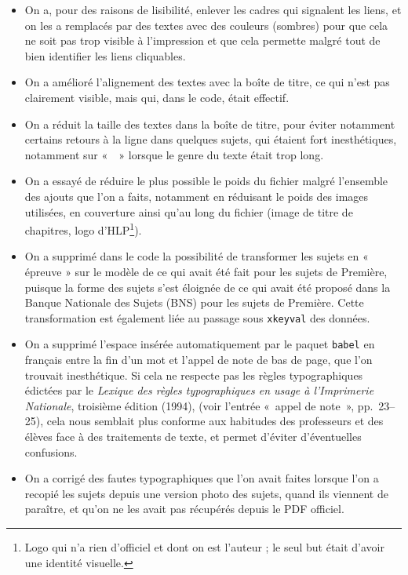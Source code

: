 \begin{itemize}
\item On a, pour des raisons de lisibilité, enlever les cadres qui signalent les liens, et on les a remplacés par des textes avec des couleurs (sombres) pour que cela ne soit pas trop visible à l'impression et que cela permette malgré tout de bien identifier les liens cliquables.
\item On a amélioré l'alignement des textes avec la boîte de titre, ce qui n'est pas clairement visible, mais qui, dans le code, était effectif.
\item On a réduit la taille des textes dans la boîte de titre, pour éviter notamment certains retours à la ligne dans quelques sujets, qui étaient fort inesthétiques, notamment sur «~\HQ~»{} lorsque le genre du texte était trop long.
\item On a essayé de réduire le plus possible le poids du fichier malgré l'ensemble des ajouts que l'on a faits, notamment en réduisant le poids des images utilisées, en couverture ainsi qu'au long du fichier (image de titre de chapitres, logo d'HLP\footnote{Logo qui n'a rien d'officiel et dont on est l'auteur ; le seul but était d'avoir une identité visuelle.}).
\item On a supprimé dans le code la possibilité de transformer les sujets en « épreuve »{} sur le modèle de ce qui avait été fait pour les sujets de Première, puisque la forme des sujets s'est éloignée de ce qui avait été proposé dans la Banque Nationale des Sujets (BNS) pour les sujets de Première. Cette transformation est également liée au passage sous \texttt{xkeyval} des données.
\item On a supprimé l'espace insérée automatiquement par le paquet \texttt{babel} en français entre la fin d'un mot et l'appel de note de bas de page, que l'on trouvait inesthétique. Si cela ne respecte pas les règles typographiques édictées par le \emph{Lexique des règles typographiques en usage à l'Imprimerie Nationale}, troisième édition (1994), (voir l'entrée «~appel de note~»{}, pp.~23--25), cela nous semblait plus conforme aux habitudes des professeurs et des élèves face à des traitements de texte, et permet d'éviter d'éventuelles confusions.
\item On a corrigé des fautes typographiques que l'on avait faites lorsque l'on a recopié les sujets depuis une version photo des sujets, quand ils viennent de paraître, et qu'on ne les avait pas récupérés depuis le PDF officiel.
\end{itemize}

